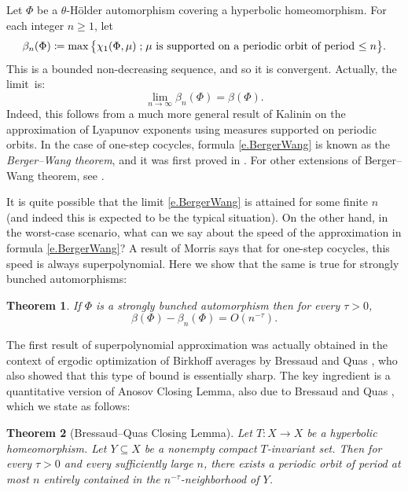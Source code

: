 \documentclass[10pt]{amsart}
\def\vcentcolon{\mathrel{\mathop\ordinarycolon}}
\providecommand\ordinarycolon{:}
\providecommand*\coloneqq{\vcentcolon\mathrel{\mkern-1.2mu}=}
\theoremstyle{plain}
\newtheorem{theorem}{Theorem}[section]
\theoremstyle{definition}
\newcommand{\st}{\;\mathord{;}\;}
\begin{document}

Let $\Phi$ be a $\theta$\nobreakdash-Hölder automorphism covering a hyperbolic homeomorphism.
For each integer \hbox{$n \ge 1$}, let
\[
\beta_n(\Phi) \coloneqq \max \big\{\chi_1(\Phi, \mu) \st \text{$\mu$ is supported on a periodic orbit of period $\le n$} \big\}.
\]
This is a bounded non-decreasing sequence,
and so it is convergent.
Actually, the limit~is:
\begin{equation}\label{e.BergerWang}
\lim_{n \to \infty} \beta_n(\Phi) = \beta(\Phi).
\end{equation}
Indeed, this follows from a much more general result of Kalinin \cite[Th.\,1.4]{Kalinin} on the approximation of Lyapunov exponents using measures supported on periodic orbits.
In the case of one-step cocycles, formula \eqref{e.BergerWang} is known as the \emph{Berger--Wang theorem}, and it was first proved in \cite{BWang}.
For other extensions of Berger--Wang theorem, see \cite{Oregon,BreuF}.

It is quite possible that the limit \eqref{e.BergerWang} is attained for some finite $n$ (and indeed this is expected to be the typical situation).
On the other hand, in the worst-case scenario, what can we say about the speed of the approximation in formula \eqref{e.BergerWang}?
A result of Morris \cite{Morris_rapidly} says that for one-step cocycles, this speed is always superpolynomial.
Here we show that the same is true for strongly bunched automorphisms:

\begin{theorem}\label{t.super_pol}
If $\Phi$ is a strongly bunched automorphism then for every $\tau>0$,
\[
\beta(\Phi) - \beta_n(\Phi) = O(n^{-\tau}).
\]
\end{theorem}

The first result of superpolynomial approximation was actually obtained in the context of ergodic optimization of Birkhoff averages by Bressaud and Quas \cite{BQuas}, who also showed that this type of bound is essentially sharp.
The key ingredient is a quantitative version of Anosov Closing Lemma, also due to Bressaud and Quas \cite{BQuas}, which we state as follows:

\begin{theorem}[Bressaud--Quas Closing Lemma]\label{t.BQ}
Let $T \colon X \to X$ be a hyperbolic homeomorphism.
Let $Y \subseteq X$ be a nonempty compact $T$-invariant set.
Then for every $\tau>0$ and every sufficiently large $n$, there exists a periodic orbit of period at most $n$ entirely contained in the $n^{-\tau}$-neighborhood of $Y$.
\end{theorem}
\end{document}
